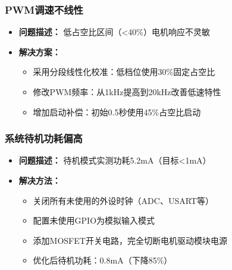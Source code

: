 \subsubsection{PWM调速不线性}
\begin{itemize}
    \item \textbf{问题描述：} 低占空比区间（<40\%）电机响应不灵敏
    \item \textbf{解决方案：}
    \begin{itemize}
        \item 采用分段线性化校准：低档位使用30\%固定占空比
        \item 修改PWM频率：从1kHz提高到20kHz改善低速特性
        \item 增加启动补偿：初始0.5秒使用45\%占空比启动
    \end{itemize}
\end{itemize}

\subsubsection{系统待机功耗偏高}
\begin{itemize}
    \item \textbf{问题描述：} 待机模式实测功耗5.2mA（目标<1mA）
    \item \textbf{解决方法：}
    \begin{itemize}
        \item 关闭所有未使用的外设时钟（ADC、USART等）
        \item 配置未使用GPIO为模拟输入模式
        \item 添加MOSFET开关电路，完全切断电机驱动模块电源
        \item 优化后待机功耗：0.8mA（下降85\%）
    \end{itemize}
\end{itemize}